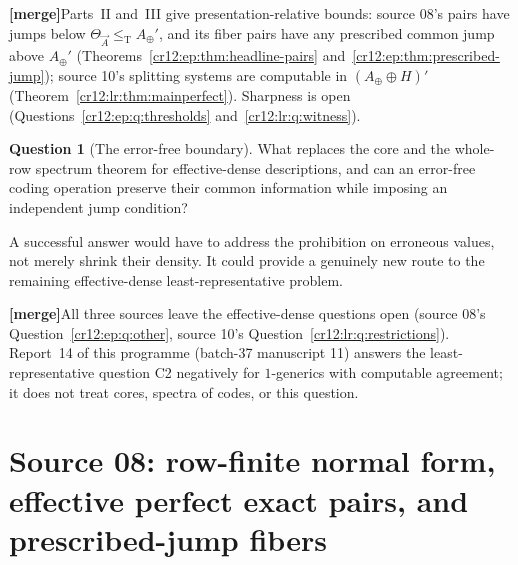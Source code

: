 \documentclass[11pt,letterpaper]{article}
\theoremstyle{plain}
\theoremstyle{definition}
\newtheorem{question}[theorem]{Question}
\theoremstyle{remark}
\numberwithin{equation}{section}
\newcommand{\leT}{\leq_{\mathrm T}}
\newcommand{\mergenote}[1]{\par\smallskip\noindent
 {\small\textsf{\textbf{[merge]}}\enspace #1}\par\smallskip}
\newcommand{\Aplus}{A_{\oplus}}          %
\begin{document}
\mergenote{Parts~II and~III give presentation-relative bounds: source 08's pairs have
jumps below $\Theta_{\vec A}\leT\Aplus'$, and its fiber pairs have any prescribed
common jump above $\Aplus'$ (Theorems~\ref{cr12:ep:thm:headline-pairs}
and~\ref{cr12:ep:thm:prescribed-jump}); source 10's splitting systems are computable
in $(\Aplus\oplus H)'$ (Theorem~\ref{cr12:lr:thm:mainperfect}). Sharpness is open
(Questions~\ref{cr12:ep:q:thresholds} and~\ref{cr12:lr:q:witness}).}

\begin{question}[The error-free boundary]\label{cr12:q:ed}
What replaces the core and the whole-row spectrum theorem for effective-dense
descriptions, and can an error-free coding operation preserve their common
information while imposing an independent jump condition?
\end{question}
A successful answer would have to address the prohibition on erroneous values,
not merely shrink their density. It could provide a genuinely new route to the
remaining effective-dense least-representative problem.

\mergenote{All three sources leave the effective-dense questions open (source 08's
Question~\ref{cr12:ep:q:other}, source 10's Question~\ref{cr12:lr:q:restrictions}).
Report~14 of this programme (batch-37 manuscript 11) answers the least-representative
question C2 negatively for $1$-generics with computable agreement; it does not treat
cores, spectra of codes, or this question.}

\clearpage
\part{Source 08: row-finite normal form, effective perfect exact pairs, and prescribed-jump fibers}\label{cr12:part2}
\end{document}
